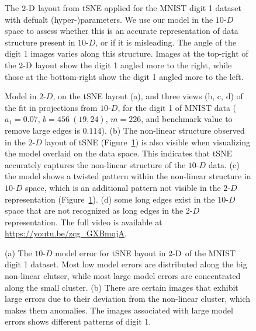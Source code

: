 \documentclass[
  12pt]{article}
\newcommand\gD{$2\text{-}D$}
\begin{document}
\begin{figure}[H]


\caption{\label{fig-tsne-best}The \(\gD{}\) layout from tSNE applied for
the MNIST digit 1 dataset with defualt (hyper-)parameters. We use our
model in the \(10\text{-}D\) space to assess whether this is an accurate
representation of data structure present in \(10\text{-}D\), or if it is
misleading. The angle of the digit 1 images varies along this structure.
Images at the top-right of the \(\gD{}\) layout show the digit 1 angled
more to the right, while those at the bottom-right show the digit 1
angled more to the left.}

\end{figure}%

\begin{figure}[H]


\caption{\label{fig-mnist-tri-proj}Model in \gD{}, on the tSNE layout
(a), and three views (b, c, d) of the fit in projections from
\(10\text{-}D\), for the digit 1 of MNIST data (\(a_1 = 0.07\),
\(b = 456 \  (19,  24)\), \(m = 226\), and benchmark value to remove
large edges is \(0.114\)). (b) The non-linear structure observed in the
\gD{} layout of tSNE (Figure~\ref{fig-tsne-best}) is also visible when
visualizing the model overlaid on the data space. This indicates that
tSNE accurately captures the non-linear structure of the \(10\text{-}D\)
data. (c) the model shows a twisted pattern within the non-linear
structure in \(10\text{-}D\) space, which is an additional pattern not
visible in the \gD{} representation (Figure~\ref{fig-tsne-best}). (d)
some long edges exist in the \(10\text{-}D\) space that are not
recognized as long edges in the \gD{} representation. The full video is
available at \url{https://youtu.be/zcg_GXBmqjA}.}

\end{figure}%

\begin{figure}[H]


\caption{\label{fig-model-error-mnist}(a) The \(10\text{-}D\) model
error for tSNE layout in \(\gD{}\) of the MNIST digit 1 dataset. Most
low model errors are distributed along the big non-linear clutser, while
most large model errors are concentrated along the small cluster. (b)
There are certain images that exhibit large errors due to their
deviation from the non-linear cluster, which makes them anomalies. The
images associated with large model errors shows different patterns of
digit 1.}

\end{figure}%
\end{document}
